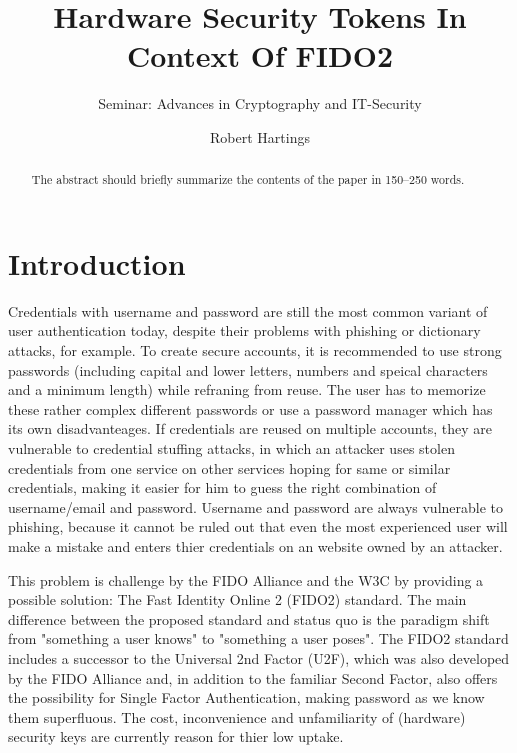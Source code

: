 \documentclass[runningheads]{llncs}
\begin{document}
%
\title{Hardware Security Tokens In Context Of FIDO2}
\subtitle{Seminar: Advances in Cryptography and IT-Security}
%
%

\author{Robert Hartings}

%
\maketitle              %
%
\begin{abstract}
The abstract should briefly summarize the contents of the paper in
150--250 words.

\end{abstract}
%
%
%
\section{Introduction}
Credentials with username and password are still the most common variant of user authentication today, despite their problems with phishing or dictionary attacks, for example. To create secure accounts, it is recommended to use strong passwords (including capital and lower letters, numbers and speical characters and a minimum length) while refraning from reuse. The user has to memorize these rather complex different passwords or use a password manager which has its own disadvanteages. If credentials are reused on multiple accounts, they are vulnerable to credential stuffing attacks, in which an attacker uses stolen credentials from one service on other services hoping for same or similar credentials, making it easier for him to guess the right combination of username/email and password. Username and password are always vulnerable to phishing, because it cannot be ruled out that even the most experienced user will make a mistake and enters thier credentials on an website owned by an attacker.

This problem is challenge by the FIDO Alliance and the W3C by providing a possible solution: The Fast Identity Online 2 (FIDO2) standard. The main difference between the proposed standard and status quo is the paradigm shift from "something a user knows" to "something a user poses". The FIDO2 standard includes a successor to the Universal 2nd Factor (U2F), which was also developed by the FIDO Alliance and, in addition to the familiar Second Factor, also offers the possibility for Single Factor Authentication, making password as we know them superfluous. The cost, inconvenience and unfamiliarity of (hardware) security keys are currently reason for thier low uptake.\cite{274547}\cite{9152694}
\end{document}
